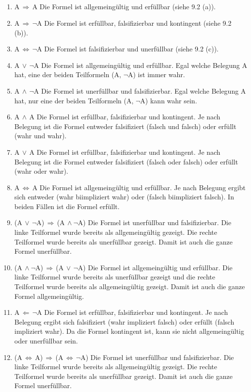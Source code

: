 \documentclass[10pt,a4paper,oneside,ngerman,numbers=noenddot]{scrartcl}
\begin{document}
\subsection{} %
\begin{enumerate}
	\item A$\, \Rightarrow \,$A
	Die Formel ist allgemeingültig und erfüllbar (siehe 9.2 (a)).
	\item A$\, \Rightarrow \,\neg$A
	Die Formel ist erfüllbar, falsifizierbar und kontingent (siehe 9.2 (b)).
	\item A$\, \Leftrightarrow \,\neg$A
	Die Formel ist falsifizierbar und unerfüllbar (siehe 9.2 (c)).
	\item A$\, \vee \,\neg$A
	Die Formel ist allgemeingültig und erfüllbar. Egal welche Belegung A hat, eine der beiden Teilformeln (A, $\neg$A) ist immer wahr.
	\item A$\, \wedge \,\neg$A
	Die Formel ist unerfüllbar und falsifizierbar. Egal welche Belegung A hat, nur eine der beiden Teilformeln (A, $\neg$A) kann wahr sein.
	\item A$\, \wedge \,$A
	Die Formel ist erfüllbar, falsifizierbar und kontingent. Je nach Belegung ist die Formel entweder falsifiziert (falsch und falsch) oder erfüllt (wahr und wahr).
	\item A$\, \vee \,$A
	Die Formel ist erfüllbar, falsifizierbar und kontingent. Je nach Belegung ist die Formel entweder falsifiziert (falsch oder falsch) oder erfüllt (wahr oder wahr).
	\item A$\, \Leftrightarrow \,$A
	Die Formel ist allgemeingültig und erfüllbar. Je nach Belegung ergibt sich entweder (wahr biimpliziert wahr) oder (falsch biimpliziert falsch). In beiden Fällen ist die Formel erfüllt.
	\item (A$\, \vee \,\neg$A)$\, \Rightarrow \,$(A$\, \wedge \neg$A)
	Die Formel ist unerfüllbar und falsifizierbar. Die linke Teilformel wurde bereits als allgemeingültig gezeigt. Die rechte Teilformel wurde bereits als unerfüllbar gezeigt. Damit ist auch die ganze Formel unerfüllbar.
	\item 	(A$\, \wedge \neg$A)$\, \Rightarrow \,$(A$\, \vee \,\neg$A)
	Die Formel ist allgemeingültig und erfüllbar. Die linke Teilformel wurde bereits als unerfüllbar gezeigt und die rechte Teilformel wurde bereits als allgemeingültig gezeigt. Damit ist auch die ganze Formel allgemeingültig.
	\item A$\, \Leftarrow \,\neg$A
	Die Formel ist erfüllbar, falsifizierbar und kontingent. Je nach Belegung ergibt sich falsifiziert (wahr impliziert falsch) oder erfüllt (falsch impliziert wahr). Da die Formel kontingent ist, kann sie nicht allgemeingültig oder unerfüllbar sein.
	\item (A$\, \Leftrightarrow \,$A)$\, \Rightarrow \,$(A$\, \Leftrightarrow \,\neg$A)
	Die Formel ist unerfüllbar und falsifizierbar. Die linke Teilformel wurde bereits als allgemeingültig gezeigt. Die rechte Teilformel wurde bereits als unerfüllbar gezeigt. Damit ist auch die ganze Formel unerfüllbar.
\end{enumerate}
\end{document}

